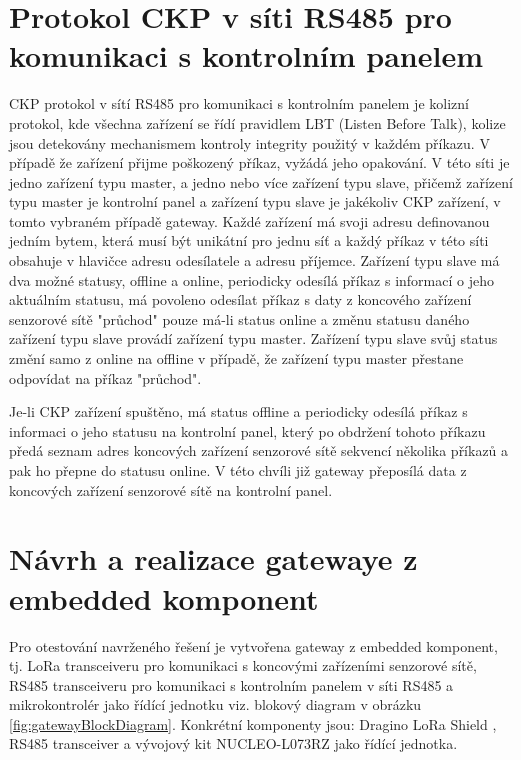 \section{Protokol CKP v síti RS485 pro komunikaci s kontrolním panelem}
CKP protokol v sítí RS485 pro komunikaci s kontrolním panelem je kolizní protokol, kde všechna zařízení se řídí pravidlem LBT (Listen Before Talk), kolize jsou detekovány mechanismem kontroly integrity použitý v každém příkazu. V případě že zařízení přijme poškozený příkaz, vyžádá jeho opakování. 
V této síti je jedno zařízení typu master, a jedno nebo více zařízení typu slave, přičemž zařízení typu master je kontrolní panel a zařízení typu slave je jakékoliv CKP zařízení, v tomto vybraném případě gateway.
Každé zařízení má svoji adresu definovanou jedním bytem, která musí být unikátní pro jednu síť a každý příkaz v této síti obsahuje v hlavičce adresu odesílatele a adresu příjemce.
Zařízení typu slave má dva možné statusy, offline a online, periodicky odesílá příkaz s informací o jeho aktuálním statusu, má povoleno odesílat příkaz s daty z koncového zařízení senzorové sítě "průchod" pouze má-li status online a změnu statusu daného zařízení typu slave provádí zařízení typu master. 
Zařízení typu slave svůj status změní samo z online na offline v případě, že zařízení typu master přestane odpovídat na příkaz "průchod".

Je-li CKP zařízení spuštěno, má status offline a periodicky odesílá příkaz s informaci o jeho statusu na kontrolní panel, který po obdržení tohoto příkazu předá seznam adres koncových zařízení senzorové sítě sekvencí několika příkazů a pak ho přepne do statusu online. V této chvíli již gateway přeposílá data z koncových zařízení senzorové sítě na kontrolní panel.



\section{Návrh a realizace gatewaye z embedded komponent}
Pro otestování navrženého řešení je vytvořena gateway z embedded komponent, tj. LoRa transceiveru pro komunikaci s koncovými zařízeními senzorové sítě, RS485 transceiveru pro komunikaci s kontrolním panelem v síti RS485 a mikrokontrolér jako řídící jednotku viz. blokový diagram v obrázku \ref{fig:gatewayBlockDiagram}.
Konkrétní komponenty jsou: Dragino LoRa Shield \cite{draginoWiki}, RS485 transceiver \cite{rs485tr} a vývojový kit NUCLEO-L073RZ \cite{nucleoST} jako řídící jednotka.

